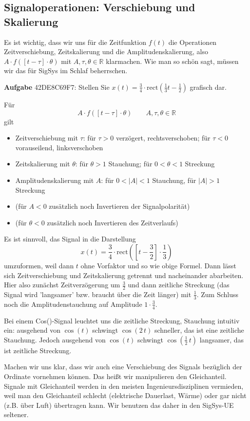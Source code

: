 \documentclass[11pt,a4paper,DIV=12]{scrartcl}
\numberwithin{equation}{section}
\numberwithin{figure}{section}
\begin{document}
\subsection{Signaloperationen: Verschiebung und Skalierung}
\label{sec:42DE8C69F7}
\begin{Ziel}
Es ist wichtig, dass wir uns für die Zeitfunktion $f(t)$
die Operationen
Zeitverschiebung,
Zeitskalierung und die Amplitudenskalierung, also
$A \cdot f(\left[t-\tau\right]\cdot \theta)$ mit $A,\tau,\theta\in\mathbb{R}$
klarmachen.
%
Wie man so schön sagt, müssen wir das für SigSys im Schlaf beherrschen.
\end{Ziel}
\textbf{Aufgabe} {\tiny 42DE8C69F7}: Stellen Sie
{$x(t) = \frac{3}{4} \cdot \mathrm{rect}(\frac{1}{3} t-\frac{1}{2})$}
grafisch dar.
\begin{Werkzeug}
Für
\begin{equation}
A \cdot f(\left[t-\tau\right]\cdot \theta)  \qquad A,\tau,\theta\in\mathbb{R}
\end{equation}
gilt
\begin{itemize}
  \item Zeitverschiebung mit
  $\tau$: für $\tau>0$ verzögert, rechtsverschoben; für $\tau<0$ vorauseilend, linksverschoben
  \item Zeitskalierung mit $\theta$: für $\theta>1$ Stauchung; für $0<\theta<1$ Streckung
  \item Amplitudenskalierung mit $A$: für $0<|A|<1$ Stauchung, für $|A|>1$ Streckung
  \item (für $A<0$ zusätzlich noch Invertieren der Signalpolarität)
  \item (für $\theta<0$ zusätzlich noch Invertieren des Zeitverlaufs)
\end{itemize}
\end{Werkzeug}
\begin{Ansatz}
Es ist sinnvoll, das Signal in die Darstellung
\begin{equation}
x(t) = \frac{3}{4} \cdot \mathrm{rect}(\left[t-\frac{3}{2}\right]\cdot \frac{1}{3})
\end{equation}
umzuformen, weil dann $t$ ohne Vorfaktor und so wie obige Formel.
Dann lässt sich Zeitverschiebung und Zeitskalierung
getrennt und nacheinander abarbeiten. Hier also zunächst Zeitverzögerung um
$\frac{3}{2}$ und dann zeitliche Streckung (das Signal wird 'langsamer' bzw.
braucht über die Zeit länger) mit $\frac{1}{3}$.
%
Zum Schluss noch die Amplitudenstauchung auf Amplitude $1 \cdot \frac{3}{4}$.

Bei einem Cos()-Signal leuchtet uns die zeitliche Streckung, Stauchung intuitiv
ein: ausgehend von $\cos(t)$ schwingt $\cos(2\,t)$ schneller, das ist eine
zeitliche Stauchung. Jedoch ausgehend von $\cos(t)$ schwingt $\cos(\frac{1}{2}\,t)$
langsamer, das ist zeitliche Streckung.

Machen wir uns klar, dass wir auch eine Verschiebung des Signals bezüglich der
Ordinate vornehmen können. Das heißt wir manipulieren den Gleichanteil.
%
Signale mit Gleichanteil werden in den meisten Ingenieursdisziplinen vermieden,
weil man den Gleichanteil schlecht (elektrische Dauerlast, Wärme)
oder gar nicht (z.B. über Luft) übertragen kann. Wir benutzen das daher in den
SigSys-UE seltener.

\end{Ansatz}
\end{document}
